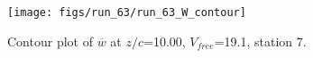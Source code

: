 \begin{figure}[H]
\centering
\texttt{[image: figs/run\_63/run\_63\_W\_contour]}
\caption{Contour plot of $\overline{w}$ at $z/c$=10.00, $V_{free}$=19.1, station 7.}
\end{figure}



